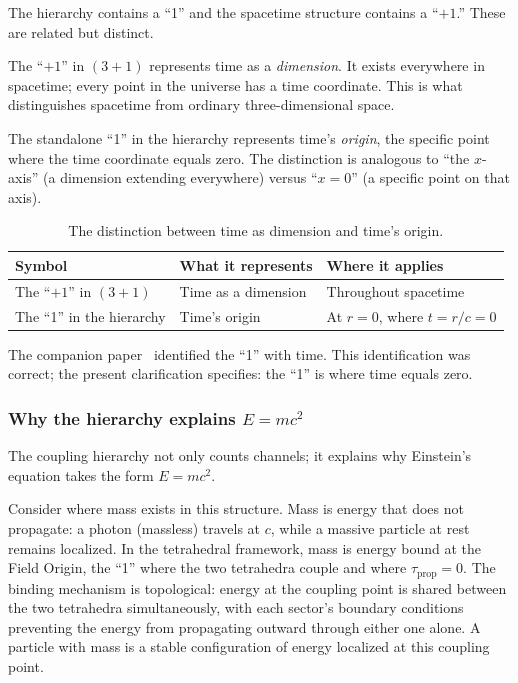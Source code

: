 \documentclass[aps,prd,preprint,superscriptaddress,showpacs,preprintnumbers,amsmath,amssymb,nofootinbib]{revtex4-2}
\begin{document}
The hierarchy contains a ``1'' and the spacetime structure contains a ``$+1$.'' These are related but distinct.

The ``$+1$'' in $(3+1)$ represents time as a \emph{dimension}. It exists everywhere in spacetime; every point in the universe has a time coordinate. This is what distinguishes spacetime from ordinary three-dimensional space.

The standalone ``1'' in the hierarchy represents time's \emph{origin}, the specific point where the time coordinate equals zero. The distinction is analogous to ``the $x$-axis'' (a dimension extending everywhere) versus ``$x = 0$'' (a specific point on that axis).

\begin{table}[H]
\centering
\begin{tabular*}{0.95\textwidth}{@{\extracolsep{\fill}} lll @{}}
\toprule
\textbf{Symbol} & \textbf{What it represents} & \textbf{Where it applies} \\
\midrule
The ``$+1$'' in $(3+1)$ & Time as a dimension & Throughout spacetime \\
The ``1'' in the hierarchy & Time's origin & At $r = 0$, where $t = r/c = 0$ \\
\bottomrule
\end{tabular*}
\caption{The distinction between time as dimension and time's origin.}
\label{tab:one-vs-plusone}
\end{table}

The companion paper~\cite{paper6} identified the ``1'' with time. This identification was correct; the present clarification specifies: the ``1'' is where time equals zero.

\subsubsection*{Why the hierarchy explains $E = mc^2$}

The coupling hierarchy not only counts channels; it explains why Einstein's equation takes the form $E = mc^2$.

Consider where mass exists in this structure. Mass is energy that does not propagate: a photon (massless) travels at $c$, while a massive particle at rest remains localized. In the tetrahedral framework, mass is energy bound at the Field Origin, the ``1'' where the two tetrahedra couple and where $\tau_{\text{prop}} = 0$. The binding mechanism is topological: energy at the coupling point is shared between the two tetrahedra simultaneously, with each sector's boundary conditions preventing the energy from propagating outward through either one alone. A particle with mass is a stable configuration of energy localized at this coupling point.
\end{document}
